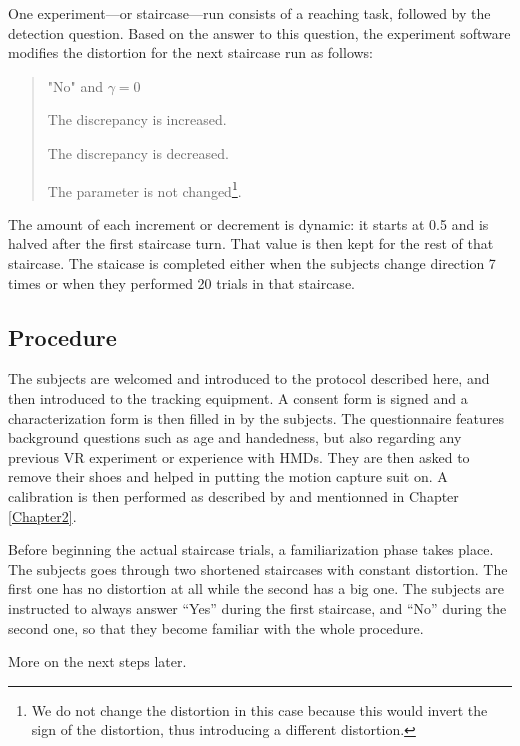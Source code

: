 One experiment---or staircase---run consists of a reaching task, followed by the detection question. Based on the answer to this question, the experiment software modifies the  distortion for the next staircase run as follows:
\begin{quote}
    \begin{labeling}{"No" and $\gamma = 0$}
      \item ["Yes"] The discrepancy is increased.
      \item ["No" and $\gamma \neq 0$] The discrepancy is decreased.
      \item ["No" and $\gamma = 0$] The parameter is not changed\footnote{We do not change the distortion in this case because this would invert the sign of the distortion, thus introducing a different distortion.}.
    \end{labeling}
\end{quote}

The amount of each increment or decrement is dynamic: it starts at \num{0.5} and is halved after the first staircase turn. That value is then kept for the rest of that staircase. The staicase is completed either when the subjects change direction 7 times or when they performed 20 trials in that staircase.

\subsection{Procedure}

The subjects are welcomed and introduced to the protocol described here, and then introduced to the tracking equipment. A consent form is signed and a characterization form is then filled in by the subjects. The questionnaire features background questions such as age and handedness, but also regarding any previous VR experiment or experience with HMDs. They are then asked to remove their shoes and helped in putting the motion capture suit on. A calibration is then performed as described by \cite{molla2017egocentric} and mentionned in Chapter \ref{Chapter2}.

Before beginning the actual staircase trials, a familiarization phase takes place. The subjects goes through two shortened staircases with constant distortion. The first one has no distortion at all while the second has a big one. The subjects are instructed to always answer ``Yes'' during the first staircase, and ``No'' during the second one, so that they become familiar with the whole procedure.

More on the next steps later.

